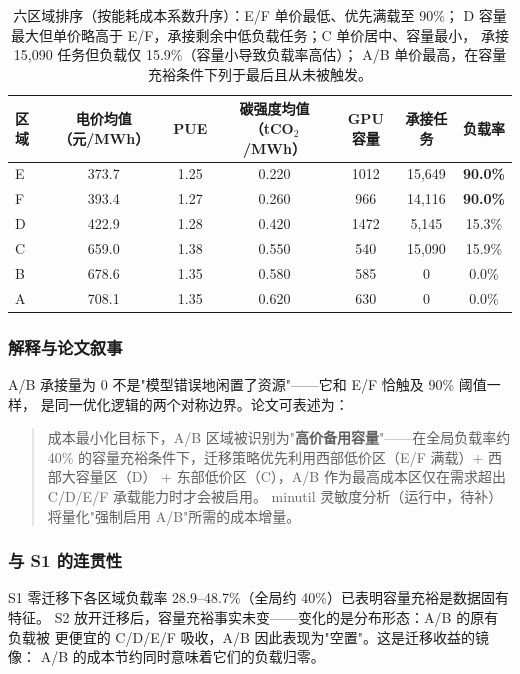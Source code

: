 \documentclass{internal-report}
\begin{document}
\begin{table}[h]
\centering
\footnotesize
\begin{tabular}{lcccccc}
\toprule
区域 & 电价均值（元/MWh） & PUE & 碳强度均值（tCO$_2$/MWh） & GPU 容量 & 承接任务 & 负载率 \\
\midrule
E & 373.7 & 1.25 & 0.220 & 1012 & 15{,}649 & \textbf{90.0\%} \\
F & 393.4 & 1.27 & 0.260 & 966 & 14{,}116 & \textbf{90.0\%} \\
D & 422.9 & 1.28 & 0.420 & 1472 & 5{,}145 & 15.3\% \\
C & 659.0 & 1.38 & 0.550 & 540 & 15{,}090 & 15.9\% \\
B & 678.6 & 1.35 & 0.580 & 585 & 0 & 0.0\% \\
A & 708.1 & 1.35 & 0.620 & 630 & 0 & 0.0\% \\
\bottomrule
\end{tabular}
\caption{六区域排序（按能耗成本系数升序）：E/F 单价最低、优先满载至 90\%；
D 容量最大但单价略高于 E/F，承接剩余中低负载任务；C 单价居中、容量最小，
承接 15{,}090 任务但负载仅 15.9\%（容量小导致负载率高估）；
A/B 单价最高，在容量充裕条件下列于最后且从未被触发。}
\label{tab:ab-empty-chain}
\end{table}

\subsubsection{解释与论文叙事}

A/B 承接量为 0 不是"模型错误地闲置了资源"——它和 E/F 恰触及 90\% 阈值一样，
是同一优化逻辑的两个对称边界。论文可表述为：

\begin{quote}\small
成本最小化目标下，A/B 区域被识别为"\textbf{高价备用容量}"——在全局负载率约 40\%
的容量充裕条件下，迁移策略优先利用西部低价区（E/F 满载）+ 西部大容量区（D）
+ 东部低价区（C），A/B 作为最高成本区仅在需求超出 C/D/E/F 承载能力时才会被启用。
minutil 灵敏度分析（运行中，待补）将量化"强制启用 A/B"所需的成本增量。
\end{quote}

\subsubsection{与 S1 的连贯性}

S1 零迁移下各区域负载率 28.9--48.7\%（全局约 40\%）已表明容量充裕是数据固有特征。
S2 放开迁移后，容量充裕事实未变——变化的是分布形态：A/B 的原有负载被
更便宜的 C/D/E/F 吸收，A/B 因此表现为"空置"。这是迁移收益的镜像：
A/B 的成本节约同时意味着它们的负载归零。
\end{document}

